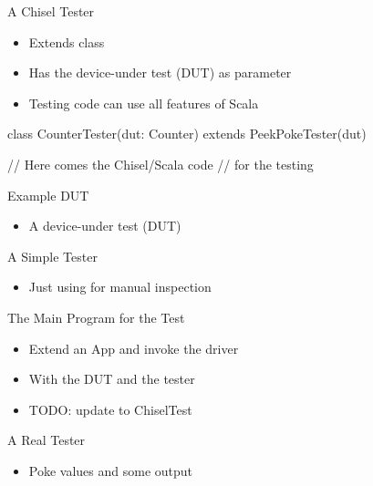 \begin{frame}[fragile]{A Chisel Tester}
\begin{itemize}
\item Extends class 
\item Has the device-under test (DUT) as parameter
\item Testing code can use all features of Scala
\end{itemize}
\begin{chisel}
class CounterTester(dut: Counter) extends PeekPokeTester(dut) {

  // Here comes the Chisel/Scala code
  // for the testing
}
\end{chisel}
\end{frame}

\begin{frame}[fragile]{Example DUT}
\begin{itemize}
\item A device-under test (DUT)
\end{itemize}
\end{frame}

\begin{frame}[fragile]{A Simple Tester}
\begin{itemize}
\item Just using  for manual inspection
\end{itemize}
\end{frame}


\begin{frame}[fragile]{The Main Program for the Test}
\begin{itemize}
\item Extend an App and invoke the  driver
\item With the DUT and the tester
\item TODO: update to ChiselTest
\end{itemize}
\end{frame}

\begin{frame}[fragile]{A Real Tester}
\begin{itemize}
\item Poke values and  some output
\end{itemize}
\end{frame}

